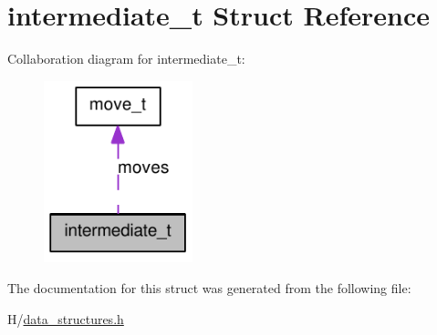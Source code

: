 \hypertarget{structintermediate__t}{
\section{intermediate\_\-t Struct Reference}
\label{structintermediate__t}
}


Collaboration diagram for intermediate\_\-t:\nopagebreak
\begin{figure}[H]
\begin{center}
\leavevmode
\includegraphics[width=122pt]{structintermediate__t__coll__graph}
\end{center}
\end{figure}


The documentation for this struct was generated from the following file:\begin{DoxyCompactItemize}
\item 
H/\hyperlink{data__structures_8h}{data\_\-structures.h}\end{DoxyCompactItemize}
